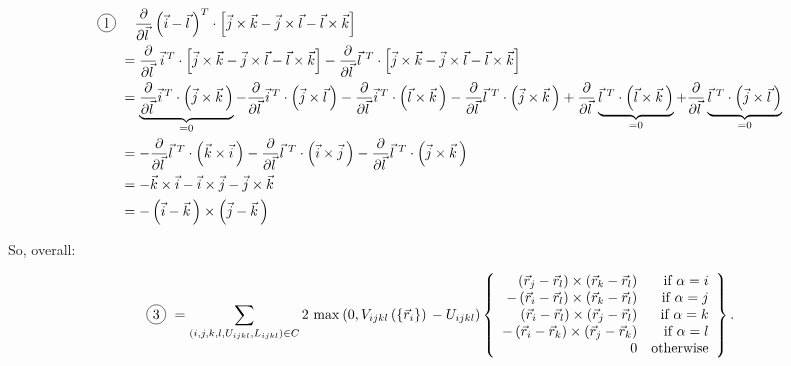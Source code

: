 \documentclass[a4paper]{article}
\newcommand*\circled[1]{
  \tikz[baseline=(char.base)]{
    \node[shape=circle,draw,inner sep=2pt] (char) {#1};
  }
}
\begin{document}
\begin{align}
  \text{\circled{l}} &\quad \frac{\partial}{\partial \vec{l}\,} 
    \vecDiff{i}{l}^{T}
    \cdot \left[
      \vec{j} \times \vec{k} - \vec{j} \times \vec{l} - \vec{l} \times \vec{k} 
    \right] \\
  &= \frac{\partial}{\partial \vec{l}\,}\, \vec{i}^{\,T} \cdot \left[
      \vec{j} \times \vec{k} - \vec{j} \times \vec{l} - \vec{l} \times \vec{k} 
    \right] - \frac{\partial}{\partial \vec{l}\,} \vec{l}^{\,\,T} \cdot \left[
      \vec{j} \times \vec{k} - \vec{j} \times \vec{l} - \vec{l} \times \vec{k}
    \right]\\
  &= \underbrace{
      \frac{\partial}{\partial \vec{l}\,} \vec{i}^{\,T} \cdot \vecCross{j}{k}
    }_{=0} 
    - \frac{\partial}{\partial \vec{l}\,} \vec{i}^{\,T} \cdot \left( 
      \vec{j} \times \vec{l}\,
    \right)
    - \frac{\partial}{\partial \vec{l}\,} \vec{i}^{\,T} \cdot \vecCross{l}{k}
    - \frac{\partial}{\partial \vec{l}\,} \vec{l}^{\,\,T} \cdot \vecCross{j}{k}
    + \frac{\partial}{\partial \vec{l}\,} \underbrace{
      \vec{l}^{\,\,T} \cdot \vecCross{l}{k} 
    }_{=0}
    + \frac{\partial}{\partial \vec{l}\,} \underbrace{
      \vec{l}^{\,\,T} \cdot \vecCross{j}{l}
    }_{=0} \\
  &= - \frac{\partial}{\partial \vec{l}\,} \vec{l}^{\,\,T} \cdot \vecCross{k}{i}
    - \frac{\partial}{\partial \vec{l}\,} \vec{l}^{\,\,T} \cdot \vecCross{i}{j}
    - \frac{\partial}{\partial \vec{l}\,} \vec{l}^{\,\,T} \cdot \vecCross{j}{k} \\
  &= - \vec{k} \times \vec{i} - \vec{i} \times \vec{j} - \vec{j} \times \vec{k} \\
  &= - \vecDiff{i}{k} \times \vecDiff{j}{k} 
\end{align}

So, overall:

\begin{equation}
  \text{\circled{3}} = \chiralSum 2\ \chiralErrorFirstTerm{} \left\{ \begin{array}{rr}
    \posVecDiff{j}{l} \times \posVecDiff{k}{l} & \textrm{if }\alpha = i\\
    - \posVecDiff{i}{l} \times \posVecDiff{k}{l} & \textrm{if }\alpha = j\\
    \posVecDiff{i}{l} \times \posVecDiff{j}{l} & \textrm{if }\alpha = k\\
    - \posVecDiff{i}{k} \times \posVecDiff{j}{k} & \textrm{if }\alpha = l\\
    0 & \textrm{otherwise}
  \end{array} \right\}.
\end{equation}
\end{document}
